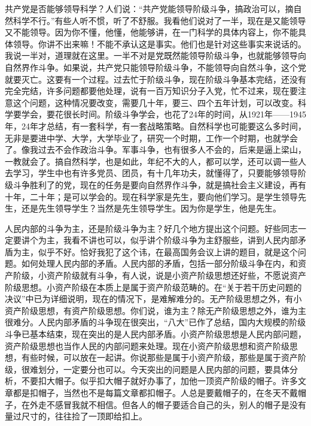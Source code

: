 共产党是否能够领导科学？人们说：“共产党能领导阶级斗争，搞政治可以，摘自然科学不行。”有些人听不惯，听了不舒服。我看他们说对了一半，现在是又能领导又不能领导。因为你不懂，他懂，他能够讲，在一门科学的具体内容上，你不能具体领导。你讲不出来嘛！不能不承认这是事实。他们也是针对这些事实来说话的。我说一半对，道理就在这里。一半不对是党既然能领导阶级斗争，也就能够领导向自然界作斗争。如果说，共产党只能领导阶级斗争，不能领导向自然斗争，这个党就要灭亡。这要有一个过程。过去忙于阶级斗争，现在阶级斗争基本完结，还没有完全完结，许多问题都要他处理，说有一百万知识分子入党，忙不过来，现在要注意这个问题，这种情况要改变，需要几十年，要三、四个五年计划，可以改变。科学要学会，要花很长时间。阶级斗争学会，也花了24年的时间，从1921年——1945年，24年才总结，有一套科学，有一套战略策略。自然科学也可能要这么多时间，无非是要进中学、大学，大学毕业了，研究一个时期，工作一个时期，也就学会了。像我过去不会作政治斗争。军事斗争，也有很多人不会的，后来是逼上梁山，一教就会了。搞自然科学，也是如此，年纪不大的人，都可以学，还可以调一些人去学习，学生中也有许多党员、团员，有十几年功夫，就懂得了，只要能够领导阶级斗争胜利了的党，现在的任务是要向自然界作斗争，就是搞社会主义建设，再有十年，二十年；是可以学会的。现在科学家是先生，要向他们学习。是学生领导先生，还是先生领导学生？当然是先生领导学生。因为你是学生，他是先生。

人民内部的斗争为主，还是阶级斗争为主？好几个地方提出这个问题。好些同志一定要讲个为主，我看不讲也可以，似乎讲个阶级斗争为主舒服些，讲到人民内部矛盾为主，似乎不好。恰好我犯了这个讳，在最高国务会议上讲的题目，就是这个问题。如何处理人民内部的矛盾。人民内部的矛盾，包括一部分阶级斗争在内，和资产阶级，小资产阶级就有斗争，有人说，说是小资产阶级思想还好些，不愿说资产阶级思想。小资产阶级在本质上是属于资产阶级范畴的。在“关于若干历史问题的决议”中已为详细说明，现在的情况下，是难解难分的。无产阶级思想之外，有小资产阶级思想，有资产阶级思想。你们说，谁为主？除无产阶级思想之外，谁为主很难分。人民内部矛盾的斗争现在很突出，“八大”已作了总结，国内大规模的阶级斗争已基本结束，现在突出的是人民内部矛盾。小资产阶级思想是人民内部问题，资产阶级思想也当作人民的内部问题来处理。现在小资产阶级思想和资产阶级思想，有些时候，可以放在一起讲。你说那些是属于小资产阶级，那些是属于资产阶级，很难划分，一定要分也可以。今天突出的问题是人民内部的问题，要具体分析，不要扣大帽子。似乎扣大帽子就好办事了，加他一顶资产阶级的帽子。许多文章都是扣帽子，当然也不是每篇文章都扣帽子。人总是要戴帽子的，在冬天不戴帽子，在外走不感冒我就不相信。但各人的帽子要适合自己的头，别人的帽子是没有量过尺寸的，往往捡了一顶即给扣上。

